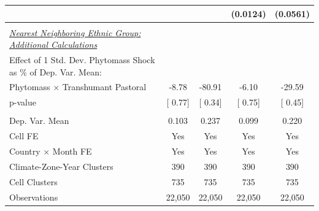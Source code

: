 {\begin{tabular}{l*{4}{c}}
                    &               &               &(0.0124)         &(0.0561)         \\
\midrule
\\ \underline{\emph{Nearest Neighboring Ethnic Group: Additional Calculations}} &               &               &               &               \\
[1em] Effect of 1 Std. Dev. Phytomass Shock as $\%$ of Dep. Var. Mean:&               &               &               &               \\
[1em] \hspace{15pt} Phytomass $\times$ Transhumant Pastoral& -8.78         &-80.91         & -6.10         &-29.59         \\
\hspace{15pt} p-value&[     0.77]         &[     0.34]         &[     0.75]         &[     0.45]         \\
\hline \\ Dep. Var. Mean& 0.103         & 0.237         & 0.099         & 0.220         \\
Cell FE             &   Yes         &   Yes         &   Yes         &   Yes         \\
Country $\times$ Month FE&   Yes         &   Yes         &   Yes         &   Yes         \\
Climate-Zone-Year Clusters&   390         &   390         &   390         &   390         \\
Cell Clusters       &   735         &   735         &   735         &   735         \\
Observations        &22,050         &22,050         &22,050         &22,050         \\
\bottomrule
\end{tabular}
}

